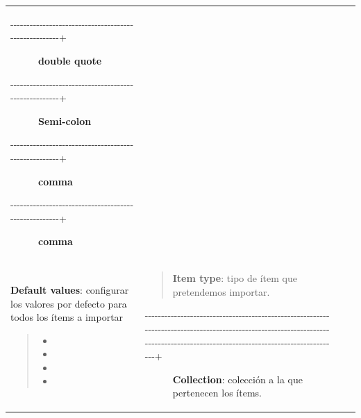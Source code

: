 \documentclass[
]{article}
\providecommand{\tightlist}{%
  \setlength{\itemsep}{0pt}\setlength{\parskip}{0pt}}
\begin{document}
\begin{longtable}[]{@{}llll@{}}
\begin{minipage}[t]{0.22\columnwidth}
\begin{description}
\item[-\/-\/-\/-\/-\/-\/-\/-\/-\/-\/-\/-\/-\/-\/-\/-\/-\/-\/-\/-\/-\/-\/-\/-\/-\/-\/-\/-\/-\/-\/-\/-\/-\/-\/-\/-\/-\/-\/-\/-\/-\/-\/-\/-\/-\/-\/-\/-\/-\/-\/-\/-\/-+]
\textbf{double quote}
\item[-\/-\/-\/-\/-\/-\/-\/-\/-\/-\/-\/-\/-\/-\/-\/-\/-\/-\/-\/-\/-\/-\/-\/-\/-\/-\/-\/-\/-\/-\/-\/-\/-\/-\/-\/-\/-\/-\/-\/-\/-\/-\/-\/-\/-\/-\/-\/-\/-\/-\/-\/-\/-+]
\textbf{Semi-colon}
\item[-\/-\/-\/-\/-\/-\/-\/-\/-\/-\/-\/-\/-\/-\/-\/-\/-\/-\/-\/-\/-\/-\/-\/-\/-\/-\/-\/-\/-\/-\/-\/-\/-\/-\/-\/-\/-\/-\/-\/-\/-\/-\/-\/-\/-\/-\/-\/-\/-\/-\/-\/-\/-+]
\textbf{comma}
\item[-\/-\/-\/-\/-\/-\/-\/-\/-\/-\/-\/-\/-\/-\/-\/-\/-\/-\/-\/-\/-\/-\/-\/-\/-\/-\/-\/-\/-\/-\/-\/-\/-\/-\/-\/-\/-\/-\/-\/-\/-\/-\/-\/-\/-\/-\/-\/-\/-\/-\/-\/-\/-+]
\textbf{comma}
\end{description}\strut
\end{minipage}\tabularnewline
\begin{minipage}[t]{0.22\columnwidth}\raggedright
\textbf{Default values}: configurar los valores por defecto para todos
los ítems a importar

\begin{quote}
\begin{itemize}
\tightlist
\item
\item
\item
\item
\end{itemize}
\end{quote}\strut
\end{minipage} & \begin{minipage}[t]{0.22\columnwidth}\raggedright
\begin{quote}
\textbf{Item type}: tipo de ítem que pretendemos importar.
\end{quote}

\begin{description}
\item[-\/-\/-\/-\/-\/-\/-\/-\/-\/-\/-\/-\/-\/-\/-\/-\/-\/-\/-\/-\/-\/-\/-\/-\/-\/-\/-\/-\/-\/-\/-\/-\/-\/-\/-\/-\/-\/-\/-\/-\/-\/-\/-\/-\/-\/-\/-\/-\/-\/-\/-\/-\/-\/-\/-\/-\/-\/-\/-\/-\/-\/-\/-\/-\/-\/-\/-\/-\/-\/-\/-\/-\/-\/-\/-\/-\/-\/-\/-\/-\/-\/-\/-\/-\/-\/-\/-\/-\/-\/-\/-\/-\/-\/-\/-\/-\/-\/-\/-\/-\/-\/-\/-\/-\/-\/-\/-\/-\/-\/-\/-\/-\/-\/-\/-\/-\/-\/-\/-\/-\/-\/-\/-\/-\/-\/-\/-\/-\/-\/-\/-\/-\/-\/-\/-\/-\/-\/-\/-\/-\/-\/-\/-\/-\/-\/-\/-\/-\/-\/-\/-\/-\/-\/-\/-\/-\/-\/-\/-\/-\/-\/-\/-\/-\/-\/-\/-\/-\/-\/-\/-\/-\/-\/-+]
\textbf{Collection}: colección a la que pertenecen los ítems.


\end{description}
\end{minipage}
\end{longtable}
\end{document}
